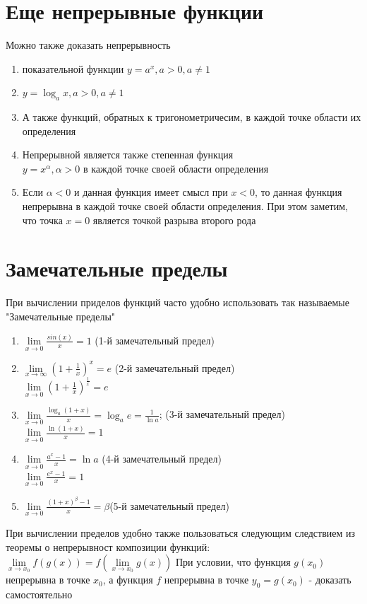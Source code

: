 \documentclass[oneside]{book}
\begin{document}
\section{Еще непрерывные функции}
Можно также доказать непрерывность
\begin{enumerate}
\item показательной функции $y=a^x, a>0, a \neq 1$
\item $y = \log_a x, a>0, a \neq 1$
\item А также функций, обратных к тригонометричесим, в каждой точке области их определения
\item Непрерывной является также степенная функция \\ $y=x^\alpha, \alpha > 0$ в каждой точке своей области определения
\item Если $\alpha < 0$ и данная функция имеет смысл при $x < 0$, то данная функция непрерывна в каждой точке своей области определения. При этом заметим, что точка $x=0$ является точкой разрыва второго рода
\end{enumerate}
\section{Замечательные пределы}
При вычислении приделов функций часто удобно использовать так называемые "Замечательные пределы"
\begin {enumerate}
\item $\lim\limits_{x\rightarrow 0}\frac{sin(x)}{x}=1$ (1-й замечательный предел)
\item $\lim\limits_{x\rightarrow \infty}(1+\frac{1}{x})^x=e$ (2-й замечательный предел)\\
$\lim\limits_{x\rightarrow 0}(1+\frac{1}{x})^{\frac{1}{x}}=e$
\item$\lim\limits_{x\rightarrow 0}\frac{\log_a(1+x)}{x}=\log_ae=\frac{1}{\ln a}$; (3-й замечательный предел)
 \\ $\lim\limits_{x\rightarrow 0}\frac{\ln(1+x)}{x}=1$ 
\item $\lim\limits_{x\rightarrow 0}\frac{a^x-1}{x}=\ln a$ (4-й замечательный предел)\\
$\lim\limits_{x\rightarrow 0}\frac{e^x-1}{x}=1$
\item $\lim\limits_{x\rightarrow 0}\frac{(1+x)^\beta-1}{x}=\beta$(5-й замечательный предел)
\end{enumerate}
При вычислении пределов удобно также пользоваться следующим следствием из теоремы о непрерывност композиции функций:\\
$\lim \limits_{x\rightarrow x_0}f(g(x))=f(\lim \limits_{x\rightarrow x_0}g(x))$
При условии, что функция $g(x_0)$ непрерывна в точке $x_0$, а функция $f$ непрерывна в точке $y_0 = g(x_0)$ - доказать самостоятельно
\end{document}
